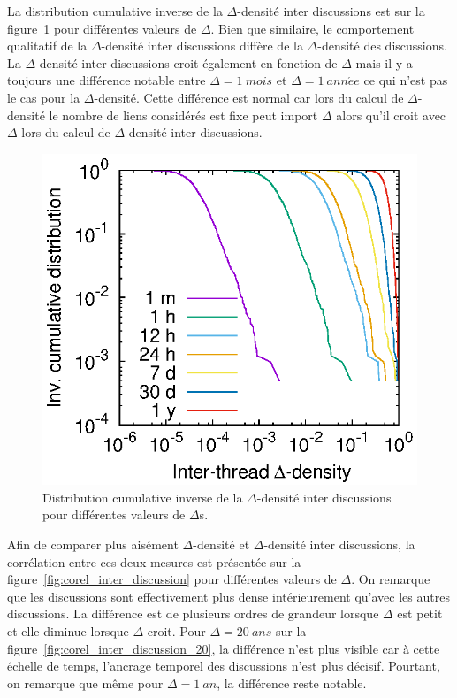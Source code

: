 La distribution cumulative inverse de la $\Delta$-densité inter discussions est sur la figure~\ref{fig:inter_dens_discussion} pour différentes valeurs de $\Delta$.
Bien que similaire, le comportement qualitatif de la $\Delta$-densité inter discussions diffère de la $\Delta$-densité des discussions.
La $\Delta$-densité inter discussions croit également en fonction de $\Delta$ mais il y a toujours une différence notable entre $\Delta= 1\  mois$ et $\Delta= 1\ ann\acute{e}e$ ce qui n'est pas le cas pour la $\Delta$-densité.
Cette différence est normal car lors du calcul de $\Delta$-densité le nombre de liens considérés est fixe peut import $\Delta$ alors qu'il croit avec $\Delta$ lors du calcul de $\Delta$-densité inter discussions.
\begin{figure}
\centering
	\includegraphics[width=0.48\linewidth]{img/mailing/inter_delta.eps}
\caption{Distribution cumulative inverse de la $\Delta$-densité inter discussions pour différentes valeurs de $\Delta$s.}
\label{fig:inter_dens_discussion}
\end{figure}


Afin de comparer plus aisément $\Delta$-densité et $\Delta$-densité inter discussions, la corrélation entre ces deux mesures est présentée sur la figure~\ref{fig:corel_inter_discussion} pour différentes valeurs de $\Delta$.
On remarque que les discussions sont effectivement plus dense intérieurement qu'avec les autres discussions.
La différence est de plusieurs ordres de grandeur lorsque $\Delta$ est petit et elle diminue lorsque $\Delta$ croit.
Pour $\Delta=20\ ans$ sur la figure~\ref{fig:corel_inter_discussion_20}, la différence n'est plus visible car à cette échelle de temps, l'ancrage temporel des discussions n'est plus décisif.
Pourtant, on remarque que même pour $\Delta=1\ an$, la différence reste notable.
 

